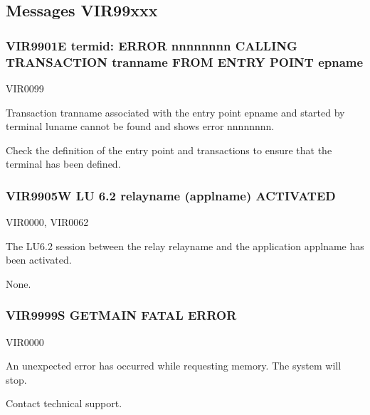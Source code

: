 \documentclass[letterpaper,10pt,english]{sphinxmanual}
\begin{document}
\subsection{Messages VIR99xxx}
\label{\detokenize{messages:messages-vir99xxx}}

\subsubsection{VIR9901E termid: ERROR nnnnnnnn CALLING TRANSACTION tranname FROM ENTRY POINT epname}
\label{\detokenize{messages:vir9901e-termid-error-nnnnnnnn-calling-transaction-tranname-from-entry-point-epname}}\begin{description}
\sphinxAtStartPar
VIR0099

\sphinxAtStartPar
Transaction tranname associated with the entry point epname and started by terminal luname cannot be found and shows error nnnnnnnn.

\sphinxAtStartPar
Check the definition of the entry point and transactions to ensure that the terminal has been defined.

\end{description}


\subsubsection{VIR9905W LU 6.2 relayname (applname) ACTIVATED}
\label{\detokenize{messages:vir9905w-lu-6-2-relayname-applname-activated}}\begin{description}
\sphinxAtStartPar
VIR0000, VIR0062

\sphinxAtStartPar
The LU6.2 session between the relay relayname and the application applname has been activated.

\sphinxAtStartPar
None.

\end{description}


\subsubsection{VIR9999S GETMAIN FATAL ERROR}
\label{\detokenize{messages:vir9999s-getmain-fatal-error}}\begin{description}
\sphinxAtStartPar
VIR0000

\sphinxAtStartPar
An unexpected error has occurred while requesting memory. The system will stop.

\sphinxAtStartPar
Contact technical support.

\end{description}
\end{document}
